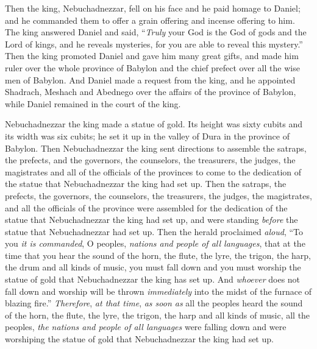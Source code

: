 \begin{biblechapter}
 Then the king, Nebuchadnezzar, fell on his face and he paid homage to Daniel; and he commanded them to offer a grain offering and incense offering to him.
\verse The king answered Daniel and said, “\textit{Truly} your God is the God of gods and the Lord of kings, and he reveals mysteries, for you are able to reveal this mystery.”
\verse Then the king promoted Daniel and gave him many great gifts, and made him ruler over the whole province of Babylon and the chief prefect over all the wise men of Babylon.
\verse And Daniel made a request from the king, and he appointed Shadrach, Meshach and Abednego over the affairs of the province of Babylon, while Daniel remained in the court of the king.
\end{biblechapter}

\begin{biblechapter} %
 Nebuchadnezzar the king made a statue of gold. Its height was sixty cubits and its width was six cubits; he set it up in the valley of Dura in the province of Babylon.
\verse Then Nebuchadnezzar the king sent directions to assemble the satraps, the prefects, and the governors, the counselors, the treasurers, the judges, the magistrates and all of the officials of the provinces to come to the dedication of the statue that Nebuchadnezzar the king had set up.
\verse Then the satraps, the prefects, the governors, the counselors, the treasurers, the judges, the magistrates, and all the officials of the province were assembled for the dedication of the statue that Nebuchadnezzar the king had set up, and were standing \textit{before} the statue that Nebuchadnezzar had set up.
\verse Then the herald proclaimed \textit{aloud}, “To you \textit{it is commanded}, O peoples, \textit{nations and people of all languages},
\verse that at the time that you hear the sound of the horn, the flute, the lyre, the trigon, the harp, the drum and all kinds of music, you must fall down and you must worship the statue of gold that Nebuchadnezzar the king has set up.
\verse And \textit{whoever} does not fall down and worship will be thrown \textit{immediately} into the midst of the furnace of blazing fire.”
\verse \textit{Therefore}, \textit{at that time}, \textit{as soon as} all the peoples heard the sound of the horn, the flute, the lyre, the trigon, the harp and all kinds of music, all the peoples, \textit{the nations and people of all languages} were falling down and were worshiping the statue of gold that Nebuchadnezzar the king had set up.

\end{biblechapter}
